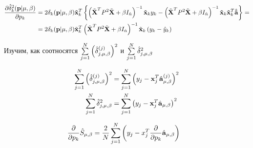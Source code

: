 \begin{align}
	\dd{\hat\delta^2_k(\mb p \cond \lams)}{p_k}
	&= 2\delta_k(\mb p \cond \lams) \tilde {\mb x}_k^T
	\fbr{
		\inv{\tilde{\mb X}^T P^2\tilde{\mb X} + \beta I_{\hat n}}
		\tilde{\mb x}_ky_k
		-
		\inv{\tilde{\mb X}^T P^2\tilde{\mb X} + \beta I_{\hat n}}
		\tilde{\mb x}_k \tilde{\mb x}^T_k
		\besta
	} = \\
	&= 2\delta_k(\mb p \cond \lams)
		\tilde {\mb x}_k^T
		\inv{\tilde{\mb X}^T P^2\tilde{\mb X} + \beta I_{\hat n}}
		\tilde{\mb x}_k \cbr{y_k - \hat y_k}
\end{align}

Изучим, как соотносятся
$\suml_{j=1}^N\sqr{\hat{\delta}_{j, \lams}^{(j)}}$
и $\suml_{j=1}^N \hat\delta_{j, \lams}^2$

\begin{align}
	\suml_{j=1}^N\sqr{\hat{\delta}_{j, \lams}^{(j)}} &=
		\suml_{j=1}^N\sqr{y_j - \mb x_j^T \hat {\mb a}_\lams^{(j)}} \\
	\suml_{j=1}^N \hat\delta_{j, \lams}^2 &=
		\suml_{j=1}^N \sqr{y_j - \mb x_j^T \hat {\mb a}_\lams}
\end{align}


\begin{align}
	\dd{}{p_k}\hat{S}_{\lams}&= \frac2N\sum_{j=1}^N\cbr{y_j - x_j^T \dd{}{p_k}\hat {\mb a}_{\lams}}
\end{align}
